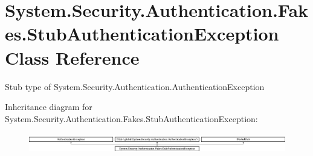 \hypertarget{class_system_1_1_security_1_1_authentication_1_1_fakes_1_1_stub_authentication_exception}{\section{System.\-Security.\-Authentication.\-Fakes.\-Stub\-Authentication\-Exception Class Reference}
\label{class_system_1_1_security_1_1_authentication_1_1_fakes_1_1_stub_authentication_exception}
}


Stub type of System.\-Security.\-Authentication.\-Authentication\-Exception 


Inheritance diagram for System.\-Security.\-Authentication.\-Fakes.\-Stub\-Authentication\-Exception\-:\begin{figure}[H]
\begin{center}
\leavevmode
\includegraphics[height=0.880503cm]{class_system_1_1_security_1_1_authentication_1_1_fakes_1_1_stub_authentication_exception}
\end{center}
\end{figure}
